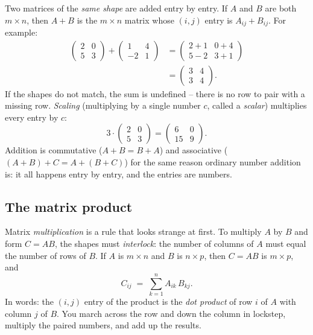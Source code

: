 Two matrices of the \emph{same shape} are added entry by entry. If $A$ and $B$
are both $m \times n$, then $A + B$ is the $m \times n$ matrix whose $(i,j)$ entry
is $A_{ij} + B_{ij}$. For example:
\begin{align*}
\begin{pmatrix} 2 & 0 \\ 5 & 3 \end{pmatrix}
+
\begin{pmatrix} 1 & 4 \\ -2 & 1 \end{pmatrix}
&= \begin{pmatrix} 2{+}1 & 0{+}4 \\ 5{-}2 & 3{+}1 \end{pmatrix} \\
&= \begin{pmatrix} 3 & 4 \\ 3 & 4 \end{pmatrix}.
\end{align*}
If the shapes do not match, the sum is undefined -- there is no row to pair
with a missing row. \emph{Scaling} (multiplying by a single number $c$, called a
\emph{scalar}) multiplies every entry by $c$:
\[
3 \cdot \begin{pmatrix} 2 & 0 \\ 5 & 3 \end{pmatrix}
= \begin{pmatrix} 6 & 0 \\ 15 & 9 \end{pmatrix}.
\]
Addition is commutative ($A + B = B + A$) and associative
($(A+B)+C = A+(B+C)$) for the same reason ordinary number addition is: it all
happens entry by entry, and the entries are numbers.

\subsection{The matrix product}
\label{ch39:matmul}

Matrix \emph{multiplication} is a rule that looks strange at first. To multiply $A$ by $B$ and form $C = AB$, the shapes must
\emph{interlock}: the number of columns of $A$ must equal the number of rows of
$B$. If $A$ is $m \times n$ and $B$ is $n \times p$, then $C = AB$ is
$m \times p$, and
\[
C_{ij} \;=\; \sum_{k=1}^{n} A_{ik}\,B_{kj}.
\]
In words: the $(i,j)$ entry of the product is the \emph{dot product} of row $i$
of $A$ with column $j$ of $B$. You march across the row and down the column in
lockstep, multiply the paired numbers, and add up the results.

